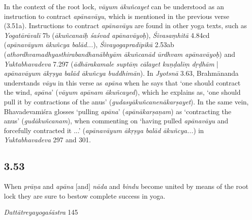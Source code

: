 \begin{ekdosis}
\begin{philcomm}[hp03_052]
In the context of the root lock, \emph{vāyum ākuñcayet} can be understood as an instruction to contract \emph{apāna\-vāyu}, which is mentioned in the previous verse (3.51a). Instructions to contract \emph{apāna\-vāyu} are found in other yoga texts, such as \emph{Yoga\-tārā\-valī} 7b (\emph{ākuñcanaiḥ śaśvad apānavāyoḥ}), \emph{Śiva\-saṃhitā} 4.84cd (\emph{apāna\-vāyum ākuñcya balād...}), \emph{Śiva\-yoga\-pradīpikā} 2.53ab (\emph{athordhva\-madhya\-sthira\-bandha\-nābhyām ākuñcanād ūrdhvam apānavāyoḥ}) and \emph{Yukta\-bhava\-deva} 7.297 (\emph{ādhāra\-kamale suptāṃ cālayet kuṇḍalīṃ dṛḍhām} | \emph{apāna\-vāyum ākṛṣya balād ākuñcya buddhimān}). In \emph{Jyotsnā} 3.63, Brahmānanda understands \emph{vāyu} in this verse as \emph{apāna} when he says that `one should contract the wind, \emph{apāna}' (\emph{vāyum apānam ākuñcayed}), which he explains as, `one should pull it by contractions of the anus' (\emph{gudasyā\-kuñcanenā\-karṣayet}). In the same vein, Bhava\-deva\-miśra glosses `pulling \emph{apāna}' (\emph{apānā\-karṣaṇam}) as `contracting the anus' (\emph{gudā\-kuñcanam}), when commenting on `having pulled \emph{apāna\-vāyu} and forcefully contracted it ...' (\emph{apāna\-vāyum ākṛṣya balād ākuñcya...}) in \emph{Yukta\-bhava\-deva} 297 and 301.  
\end{philcomm} %

\subsection*{3.53}
\begin{translation}[hp03_053]
When \emph{prāṇa} and \emph{apāna} [and] \emph{nāda} and \emph{bindu} become united by means of the root lock they are sure to bestow complete success in yoga.
\end{translation}

\begin{sources}[hp03_053]
\emph{Dattātreyayogaśāstra} 145
\begin{versinnote}
\tl{\var{145c gatvā yogasya saṃ° ] gacchato yogasaṃ° M1A}\\+}
\tl{\var{145d yacchato ] gacchato M1, kurute AM2, gachate \pi}\\!}
\end{versinnote}

\end{sources}


\end{ekdosis}
